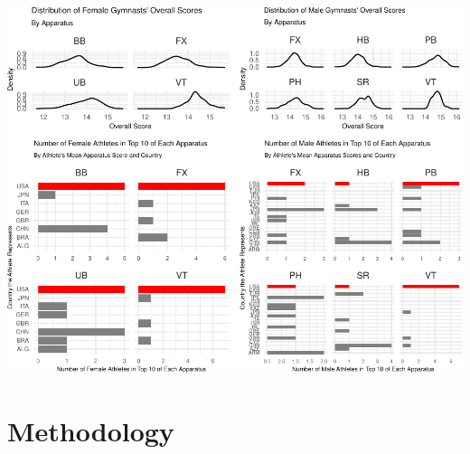 \documentclass[
  10.5pt,
  letterpaper,
  DIV=11,
  numbers=noendperiod]{scrartcl}
\begin{document}
\includegraphics{Main_files/figure-pdf/top-10-athletes-1.pdf}

\hypertarget{methodology}{%
\section{Methodology}\label{methodology}}
\end{document}
